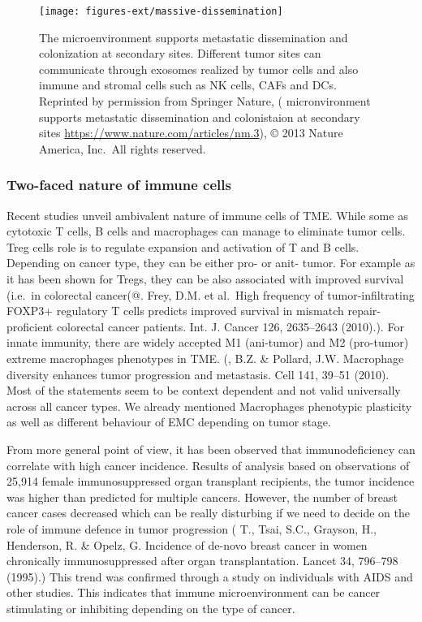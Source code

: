 \documentclass[12pt,]{book}
\theoremstyle{definition}
\theoremstyle{definition}
\theoremstyle{definition}
\theoremstyle{remark}
\begin{document}
\begin{figure}

{\centering \texttt{[image: figures-ext/massive-dissemination]} 

}

\caption{The microenvironment supports metastatic
dissemination and colonization at secondary sites. Different tumor sites
can communicate through exosomes realized by tumor cells and also immune
and stromal cells such as NK cells, CAFs and DCs. Reprinted by
permission from Springer Nature, (\citet{The} micronvironment supports
metastatic dissemination and colonistaion at secondary sites
\url{https://www.nature.com/articles/nm.3}), © 2013 Nature America,
Inc.~All rights reserved.}\label{fig:met-dis}
\end{figure}










\hypertarget{two-faced-nature-of-immune-cells}{%
\subsubsection{Two-faced nature of immune
cells}\label{two-faced-nature-of-immune-cells}}

Recent studies unveil ambivalent nature of immune cells of TME. While
some as cytotoxic T cells, B cells and macrophages can manage to
eliminate tumor cells. Treg cells role is to regulate expansion and
activation of T and B cells. Depending on cancer type, they can be
either pro- or anit- tumor. For example as it has been shown for Tregs,
they can be also associated with improved survival (i.e.~in colorectal
cancer(@. Frey, D.M. et al.~High frequency of tumor-infiltrating FOXP3+
regulatory T cells predicts improved survival in mismatch
repair-proficient colorectal cancer patients. Int. J. Cancer 126,
2635--2643 (2010).). For innate immunity, there are widely accepted M1
(ani-tumor) and M2 (pro-tumor) extreme macrophages phenotypes in TME.
(\citet{Qian}, B.Z. \& Pollard, J.W. Macrophage diversity enhances tumor
progression and metastasis. Cell 141, 39--51 (2010). Most of the
statements seem to be context dependent and not valid universally across
all cancer types. We already mentioned Macrophages phenotypic plasticity
as well as different behaviour of EMC depending on tumor stage.

From more general point of view, it has been observed that
immunodeficiency can correlate with high cancer incidence. Results of
analysis based on observations of 25,914 female immunosuppressed organ
transplant recipients, the tumor incidence was higher than predicted for
multiple cancers. However, the number of breast cancer cases decreased
which can be really disturbing if we need to decide on the role of
immune defence in tumor progression (\citet{Stewart} T., Tsai, S.C.,
Grayson, H., Henderson, R. \& Opelz, G. Incidence of de-novo breast
cancer in women chronically immunosuppressed after organ
transplantation. Lancet 34, 796--798 (1995).) This trend was confirmed
through a study on individuals with AIDS and other studies. This
indicates that immune microenvironment can be cancer stimulating or
inhibiting depending on the type of cancer.
\end{document}
